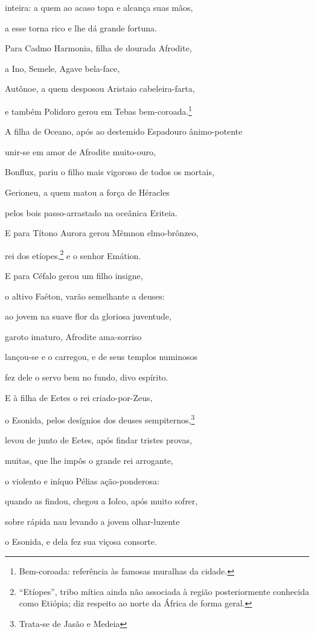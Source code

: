 \begin{pages}
\begin{Rightside}
inteira: a quem ao acaso topa e alcança suas mãos,

a esse torna rico e lhe dá grande fortuna.

\quad{}Para Cadmo Harmonia, filha de dourada Afrodite, 

a Ino, Semele, Agave bela-face,

Autônoe, a quem desposou Aristaio cabeleira-farta,

e também Polidoro gerou em Tebas bem-coroada.\footnote{Bem-coroada: referência às famosas muralhas da cidade.}

\quad{}A filha de Oceano, após ao destemido Espadouro ânimo-potente

unir-se em amor de Afrodite muito-ouro, 

Bonflux, pariu o filho mais vigoroso de todos os mortais,

Gerioneu, a quem matou a força de Héracles

pelos bois passo-arrastado na oceânica Eriteia.

\quad{}E para Títono Aurora gerou Mêmnon elmo-brônzeo,

rei dos etíopes,\footnote{``Etíopes'', tribo mítica ainda não associada à região
posteriormente conhecida como Etiópia; diz respeito ao norte da África
de forma geral.} e o senhor Emátion. 

E para Céfalo gerou um filho insigne,

o altivo Faéton, varão semelhante a deuses:

ao jovem na suave flor da gloriosa juventude,

garoto imaturo, Afrodite ama-sorriso

lançou-se e o carregou, e de seus templos numinosos 

fez dele o servo bem no fundo, divo espírito.

\quad{}E à filha de Eetes o rei criado-por-Zeus,

o Esonida, pelos desígnios dos deuses sempiternos,\footnote{Trata-se de Jasão e Medeia}

levou de junto de Eetes, após findar tristes provas,

muitas, que lhe impôs o grande rei arrogante, 

o violento e iníquo Pélias ação-ponderosa:

quando as findou, chegou a Iolco, após muito sofrer,

sobre rápida nau levando a jovem olhar-luzente

o Esonida, e dela fez sua viçosa consorte.


\end{Rightside}
\end{pages}
